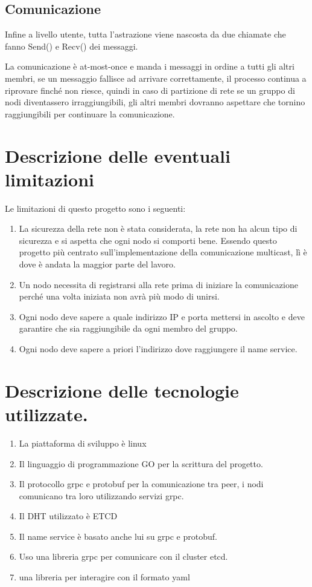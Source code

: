 \documentclass[conference]{IEEEtran}
\begin{document}
 \subsection{Comunicazione}
 Infine a livello utente, tutta l'astrazione viene nascosta da due chiamate che
 fanno Send() e Recv() dei messaggi.

 La comunicazione è at-most-once e manda i messaggi in ordine a tutti gli altri
 membri, se un messaggio fallisce ad arrivare correttamente, il processo
 continua a riprovare finché non riesce, quindi in caso di partizione di rete se
 un gruppo di nodi diventassero irraggiungibili, gli altri membri dovranno
 aspettare che tornino raggiungibili per continuare la comunicazione.
 
\section{Descrizione delle eventuali limitazioni}
Le limitazioni di questo progetto sono i seguenti:
\begin{enumerate}
  \item La sicurezza della rete non è stata considerata, la rete non ha alcun
    tipo di sicurezza e si aspetta che ogni nodo si comporti bene.
    Essendo questo progetto più centrato sull'implementazione della comunicazione
    multicast, lì è dove è andata la maggior parte del lavoro.
  \item Un nodo necessita di registrarsi alla rete prima di iniziare la
    comunicazione perché una volta iniziata non avrà più modo di unirsi.
  \item Ogni nodo deve sapere a quale indirizzo IP e porta mettersi in ascolto
    e deve garantire che sia raggiungibile da ogni membro del gruppo.
  \item Ogni nodo deve sapere a priori l'indirizzo dove raggiungere il name
    service. 
  \end{enumerate}
  \section{Descrizione delle tecnologie utilizzate.}
  \begin{enumerate}
  \item La piattaforma di sviluppo è linux
  \item Il linguaggio di programmazione GO per la scrittura del progetto.
  \item Il protocollo grpc e protobuf per la comunicazione tra peer, i nodi
    comunicano tra loro utilizzando servizi grpc.
  \item Il DHT utilizzato è ETCD
  \item Il name service è basato anche lui su grpc e protobuf.
  \item Uso una libreria grpc per comunicare con il cluster etcd.
  \item una libreria per interagire con il formato yaml
  \end{enumerate}

\begin{thebibliography}{00}
\end{thebibliography}
\vspace{12pt}
\end{document}
